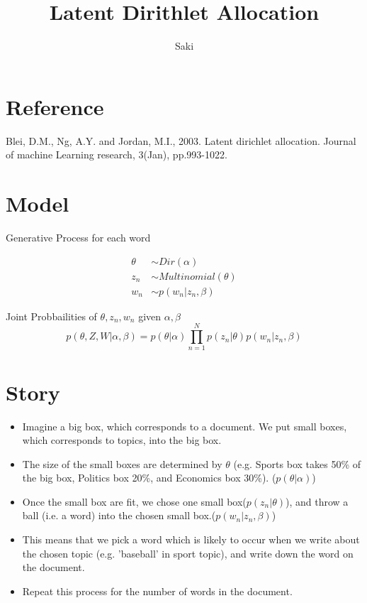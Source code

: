 \documentclass[a4paper, uplatex]{jsarticle} %
\title{Latent Dirithlet Allocation}
\author{Saki}
\begin{document}
\maketitle

\begin{abstract}
\end{abstract}

\section{Reference}
Blei, D.M., Ng, A.Y. and Jordan, M.I., 2003. Latent dirichlet allocation. Journal of machine Learning research, 3(Jan), pp.993-1022.

\section{Model}
Generative Process for each word 

\begin{align*}
\theta &\sim Dir(\alpha) \\
z_n &\sim Multinomial(\theta) \\
w_n &\sim p(w_n|z_n, \beta)
\end{align*}

Joint Probbailities of $\theta, z_n, w_n$ given $\alpha, \beta$
$$
p(\theta, Z, W| \alpha, \beta) = p(\theta | \alpha) \prod_{n=1}^N p(z_n|\theta) p(w_n|z_n, \beta)
$$

\section{Story}
\begin{itemize}
    \item Imagine a big box, which corresponds to a document. We put small boxes, which corresponds to topics, into the big box.\\ 
    \item The size of the small boxes are determined by $\theta$ (e.g. Sports box takes 50\% of the big box, Politics box 20\%, and Economics box 30\%). ($p(\theta|\alpha)$) \\
    \item Once the small box are fit, we chose one small box($p(z_n|\theta)$), and throw a ball (i.e. a word) into the chosen small box.($p(w_n|z_n,\beta)$) \\
    \item This means that we pick a word which is likely to occur when we write about the chosen topic (e.g. 'baseball' in sport topic), and write down the word on the document. \\
    \item Repeat this process for the number of words in the document. 
\end{itemize}
\end{document}
